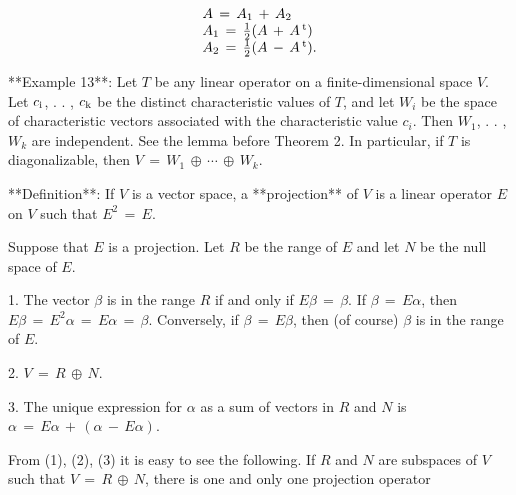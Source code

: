 \[\begin{array}{l}A\,=\,A_{1}\,+\,A_{2}\\ A_{1}\,=\,\frac{1}{2}(A\,+\,A\,^{\rm t})\\ A_{2}\,=\,\frac{1}{2}(A\,-\,A\,^{\rm t}).\end{array}\]

**Example 13**: Let \(T\) be any linear operator on a finite-dimensional space \(V\). Let \(c_{\rm i}\), . . , \(c_{\rm k}\) be the distinct characteristic values of \(T\), and let \(W_{i}\) be the space of characteristic vectors associated with the characteristic value \(c_{i}\). Then \(W_{1}\), . . , \(W_{k}\) are independent. See the lemma before Theorem 2. In particular, if \(T\) is diagonalizable, then \(V\,=\,W_{1}\,\oplus\,\cdots\,\oplus\,W_{k}\).

**Definition**: If \(V\) is a vector space, a **projection** of \(V\) is a linear operator \(E\) on \(V\) such that \(E^{2}\,=\,E\).

Suppose that \(E\) is a projection. Let \(R\) be the range of \(E\) and let \(N\) be the null space of \(E\).

1. The vector \(\beta\) is in the range \(R\) if and only if \(E\beta\,=\,\beta\). If \(\beta\,=\,E\alpha\), then \(E\beta\,=\,E^{2}\alpha\,=\,E\alpha\,=\,\beta\). Conversely, if \(\beta\,=\,E\beta\), then (of course) \(\beta\) is in the range of \(E\).

2. \(V\,=\,R\,\oplus\,N\).

3. The unique expression for \(\alpha\) as a sum of vectors in \(R\) and \(N\) is \(\alpha\,=\,E\alpha\,+\,(\alpha\,-\,E\alpha)\).

From (1), (2), (3) it is easy to see the following. If \(R\) and \(N\) are subspaces of \(V\) such that \(V\,=\,R\,\oplus\,N\), there is one and only one projection operator 